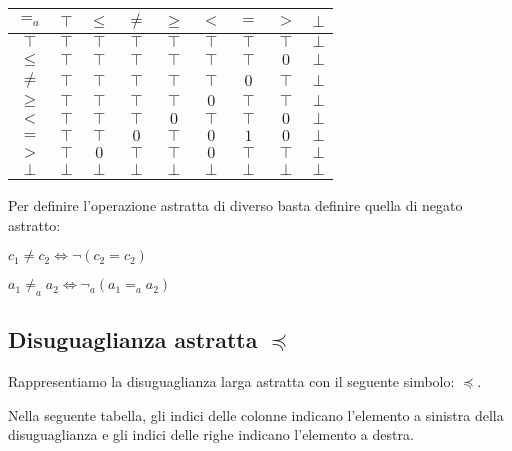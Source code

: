 \begin{center}
	\begin{tabular}{| c | c | c | c | c | c | c | c | c | }
		\hline
		$=_a$ & $\top$ & $\leq$ & $\neq$ & $\geq$ & $<$ & $=$ & $>$ & $\bot$ \\
		\hline
		$\top$ & $\top$ & $\top$ & $\top$ & $\top$ & $\top$ & $\top$ & $\top$ & $\bot$ \\
		\hline
		$\leq$ & $\top$ & $\top$ & $\top$ & $\top$ & $\top$ & $\top$ & $0$ & $\bot$\\
		\hline
		$\neq$ & $\top$ & $\top$ & $\top$ & $\top$ & $\top$ & $0$ & $\top$ & $\bot$\\
		\hline
		$\geq$ & $\top$ & $\top$ & $\top$ & $\top$ & $0$ & $\top$ & $\top$ & $\bot$\\
		\hline
		$<$ & $\top$ & $\top$ & $\top$ & $0$ & $\top$ & $\top$ & $0$ & $\bot$\\
		\hline
		$=$ & $\top$ & $\top$ & $0$ & $\top$ & $0$ & $1$ & $0$ & $\bot$\\
		\hline
		$>$ & $\top$ & $0$ & $\top$ & $\top$ & $0$ & $\top$ & $\top$ & $\bot$\\
		\hline
		$\bot$ & $\bot$ & $\bot$ & $\bot$ & $\bot$ & $\bot$ & $\bot$ & $\bot$ & $\bot$\\
		\hline
	\end{tabular}
\end{center}

Per definire l'operazione astratta di diverso basta definire quella di negato astratto:
\begin{center}
	$ c_1 \neq c_2 \iff \neg (c_2 = c_2) $
\end{center}

\begin{center}
	$ a_1 \neq _a a_2 \iff \neg _a (a_1 =_a a_2) $
\end{center}

\subsection{Disuguaglianza astratta $\preceq$}

Rappresentiamo la disuguaglianza larga astratta con il seguente simbolo: $\preceq$.

Nella seguente tabella, gli indici delle colonne indicano l'elemento a sinistra della disuguaglianza e gli indici delle righe indicano l'elemento a destra.

